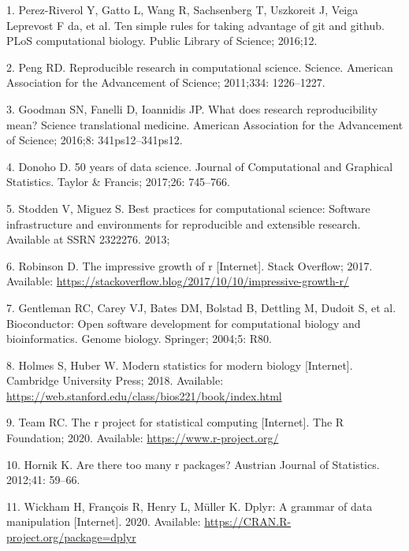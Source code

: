 \documentclass[10pt,letterpaper]{article}
\begin{document}
\hypertarget{refs}{}
\leavevmode\hypertarget{ref-perez2016}{}%
1. Perez-Riverol Y, Gatto L, Wang R, Sachsenberg T, Uszkoreit J, Veiga
Leprevost F da, et al. Ten simple rules for taking advantage of git and
github. PLoS computational biology. Public Library of Science; 2016;12.

\leavevmode\hypertarget{ref-peng2011}{}%
2. Peng RD. Reproducible research in computational science. Science.
American Association for the Advancement of Science; 2011;334:
1226--1227.

\leavevmode\hypertarget{ref-goodman2016}{}%
3. Goodman SN, Fanelli D, Ioannidis JP. What does research
reproducibility mean? Science translational medicine. American
Association for the Advancement of Science; 2016;8: 341ps12--341ps12.

\leavevmode\hypertarget{ref-donoho2017}{}%
4. Donoho D. 50 years of data science. Journal of Computational and
Graphical Statistics. Taylor \& Francis; 2017;26: 745--766.

\leavevmode\hypertarget{ref-stodden2013}{}%
5. Stodden V, Miguez S. Best practices for computational science:
Software infrastructure and environments for reproducible and extensible
research. Available at SSRN 2322276. 2013;

\leavevmode\hypertarget{ref-robinson2017}{}%
6. Robinson D. The impressive growth of r {[}Internet{]}. Stack
Overflow; 2017. Available:
\url{https://stackoverflow.blog/2017/10/10/impressive-growth-r/}

\leavevmode\hypertarget{ref-gentleman2004}{}%
7. Gentleman RC, Carey VJ, Bates DM, Bolstad B, Dettling M, Dudoit S, et
al. Bioconductor: Open software development for computational biology
and bioinformatics. Genome biology. Springer; 2004;5: R80.

\leavevmode\hypertarget{ref-holmes2018}{}%
8. Holmes S, Huber W. Modern statistics for modern biology
{[}Internet{]}. Cambridge University Press; 2018. Available:
\url{https://web.stanford.edu/class/bios221/book/index.html}

\leavevmode\hypertarget{ref-Rproject2020}{}%
9. Team RC. The r project for statistical computing {[}Internet{]}. The
R Foundation; 2020. Available: \url{https://www.r-project.org/}

\leavevmode\hypertarget{ref-hornik2012}{}%
10. Hornik K. Are there too many r packages? Austrian Journal of
Statistics. 2012;41: 59--66.

\leavevmode\hypertarget{ref-dplyr}{}%
11. Wickham H, François R, Henry L, Müller K. Dplyr: A grammar of data
manipulation {[}Internet{]}. 2020. Available:
\url{https://CRAN.R-project.org/package=dplyr}
\end{document}
